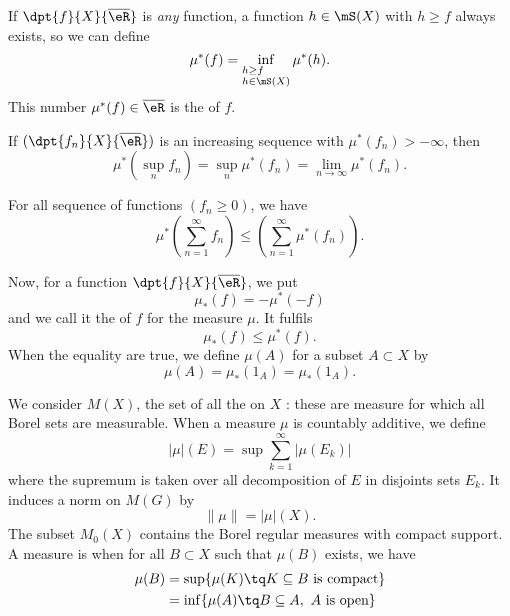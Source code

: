 If $\dpt{f}{X}{\overline{ \eR }}$ is \emph{any} function, a function $h\in\mS(X)$ with $h\geq f$ always exists, so we can define
\begin{equation}
  \mu^*(f)=\inf_{%
\begin{subarray}{l}
h\geq f\\
h\in\mS(X)
\end{subarray}
} \mu^*(h).
\end{equation}
This number $\mu^*(f)\in\overline{ \eR }$ is the  of $f$.


\begin{proposition}
If $(\dpt{f_n}{X}{\overline{ \eR }})$ is an increasing sequence with $\mu^*(f_n)>-\infty$, then
\[ 
  \mu^*(\sup_nf_n)=\sup_n\mu^*(f_n)=\lim_{n\to\infty}\mu^*(f_n).
\]

\end{proposition}

\begin{proposition}
For all sequence of functions $(f_n\geq 0)$, we have
\[ 
  \mu^*\left( \sum_{n=1}^{\infty}f_n\right)\leq\left(\sum_{n=1}^{\infty}\mu^*(f_n) \right).
\]

\end{proposition}

Now, for a function $\dpt{f}{X}{\overline{ \eR }}$, we put
\begin{equation}
  \mu_*(f)=-\mu^*(-f)
\end{equation}
and we call it the  of $f$ for the measure $\mu$. It fulfils
\[ 
  \mu_*(f)\leq\mu^*(f).
\]
When the equality are true, we define $\mu(A)$ for a subset $A\subset X$ by
\begin{equation}
   \mu(A)=\mu_*(1_A)=\mu_*(1_A).
\end{equation}

We consider $M(X)$\label{defMX}, the set of all the  on $X$ : these are measure for which all Borel sets are measurable. When a measure $\mu$ is countably additive, we define
\begin{equation}
   | \mu |(E)=\sup \sum_{k=1}^{\infty}| \mu(E_k) |
\end{equation}
where the supremum is taken over all decomposition of $E$ in disjoints sets $E_k$. It induces a norm on $M(G)$ by
\[ 
  \| \mu \|=| \mu |(X).
\]
The subset  $M_0(X)$\label{defMzX} contains the Borel regular measures with compact support. A measure is  when for all $B\subset X$ such that $\mu(B)$ exists, we have
\begin{equation}
\begin{split}
    \mu(B)&=\sup\{ \mu(K)\tq K\subseteq B \textrm{ is compact} \}\\
		&=\inf\{ \mu(A)\tq B\subseteq A, \textrm{ $A$ is open} \}
\end{split}
\end{equation}


